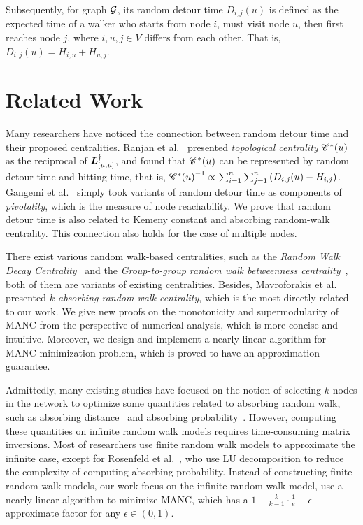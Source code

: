 \documentclass[sigconf]{acmart}
\begin{document}
Subsequently, for graph \(\mathcal{G}\), its random detour time \(D_{i,j}(u)\) is defined as the expected time of a walker who starts from node \(i\), must visit node \(u\), then first reaches node \(j\), where \(i,u,j\in V\) differs from each other.
That is, \(D_{i,j}(u)= H_{i,u}+H_{u,j}\).

\section{Related Work}

Many researchers have noticed the connection between random detour time and their proposed centralities.
Ranjan et al.~\cite{RaZh13} presented \textit{topological centrality} \(\mathscr{C}^*(u)\) as the reciprocal of \(\boldsymbol{L}^\dagger_{[u,u]}\), and found that \(\mathscr{C}^*(u)\) can be represented by random detour time and hitting time, that is, \({\mathscr{C}^*(u)}^{-1}\propto \sum_{i=1}^n\sum_{j=1}^n\left( D_{i,j}(u)-H_{i,j} \right)\).
Gangemi et al.~\cite{GaLePaGoLiZh15} simply took variants of random detour time as components of \textit{pivotality}, which is the measure of node reachability.
We prove that random detour time is also related to Kemeny constant and absorbing random-walk centrality.
This connection also holds for the case of multiple nodes.

There exist various random walk-based centralities, such as the \textit{Random Walk Decay Centrality}~\cite{WaRaSk19} and the \textit{Group-to-group random walk betweenness centrality}~\cite{GiBaRa21}, both of them are variants of existing centralities.
Besides, Mavroforakis et al.~\cite{MaMaGi15} presented \textit{\(k\) absorbing random-walk centrality}, which is the most directly related to our work.
We give new proofs on the monotonicity and supermodularity of MANC from the perspective of numerical analysis, which is more concise and intuitive.
Moreover, we design and implement a nearly linear algorithm for MANC minimization problem, which is proved to have an approximation guarantee.

Admittedly, many existing studies have focused on the notion of selecting \(k\) nodes in the network to optimize some quantities related to absorbing random walk, such as absorbing distance~\cite{LiYuHuCh14,MoBaZhPe20,ZhLuWaGu17} and absorbing probability~\cite{ZhLuWaGu17,RoGl16}.
However, computing these quantities on infinite random walk models requires time-consuming matrix inversions.
Most of researchers use finite random walk models to approximate the infinite case, except for Rosenfeld et al.~\cite{RoGl16}, who use LU decomposition to reduce the complexity of computing absorbing probability.
Instead of constructing finite random walk models, our work focus on the infinite random walk model, use a nearly linear algorithm to minimize MANC, which has a \(1-\frac{k}{k-1}\cdot\frac{1}{e}-\epsilon\) approximate factor for any \(\epsilon\in(0,1)\).
\end{document}
